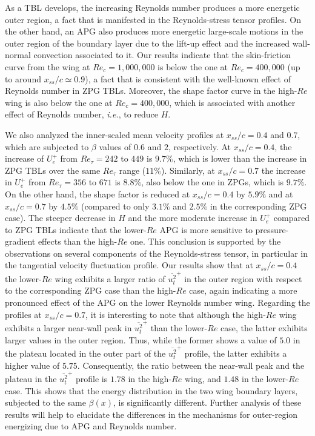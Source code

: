\documentclass[preprint,12pt,authoryear]{elsarticle}
\begin{document}
As a TBL develops, the increasing Reynolds number produces a more energetic outer region, a fact that is manifested in the Reynolds-stress tensor profiles. On the other hand, an APG also produces more energetic large-scale motions in the outer region of the boundary layer due to the lift-up effect and the increased wall-normal convection associated to it. Our results indicate that the skin-friction curve from the wing at $Re_{c}=1,000,000$ is below the one at $Re_{c}=400,000$ (up to around $x_{ss}/c \simeq 0.9$), a fact that is consistent with the well-known effect of Reynolds number in ZPG TBLs. Moreover, the shape factor curve in the high-$Re$ wing is also below the one at $Re_{c}=400,000$, which is associated with another effect of Reynolds number, {\it i.e.}, to reduce $H$. 

We also analyzed the inner-scaled mean velocity profiles at $x_{ss}/c=0.4$ and $0.7$, which are subjected to $\beta$ values of $0.6$ and $2$, respectively. At $x_{ss}/c=0.4$, the increase of $U^{+}_{e}$ from $Re_{\tau}=242$ to $449$ is $9.7\%$, which is lower than the increase in ZPG TBLs over the same $Re_{\tau}$ range ($11\%$). Similarly, at $x_{ss}/c=0.7$ the increase in $U^{+}_{e}$ from $Re_{\tau}=356$ to $671$ is $8.8\%$, also below the one in ZPGs, which is $9.7\%$. On the other hand, the shape factor is reduced at $x_{ss}/c=0.4$ by $5.9\%$ and at $x_{ss}/c=0.7$ by $4.5\%$ (compared to only $3.1\%$ and $2.5\%$ in the corresponding ZPG case). The steeper decrease in $H$ and the more moderate increase in $U^{+}_{e}$ compared to ZPG TBLs indicate that the lower-$Re$ APG is more sensitive to pressure-gradient effects than the high-$Re$ one. This conclusion is supported by the observations on several components of the Reynolds-stress tensor, in particular in the tangential velocity fluctuation profile. Our results show that at $x_{ss}/c=0.4$ the lower-$Re$ wing exhibits a larger ratio of $\overline{u^{2}_{t}}^{+}$ in the outer region with respect to the corresponding ZPG case than the high-$Re$ case, again indicating a more pronounced effect of the APG on the lower Reynolds number wing. Regarding the profiles at $x_{ss}/c=0.7$, it is interesting to note that although the high-$Re$ wing exhibits a larger near-wall peak in $\overline{u^{2}_{t}}^{+}$ than the lower-$Re$ case, the latter exhibits larger values in the outer region. Thus, while the former shows a value of $5.0$ in the plateau located in the outer part of the $\overline{u^{2}_{t}}^{+}$ profile, the latter exhibits a higher value of $5.75$. Consequently, the ratio between the near-wall peak and the plateau in the $\overline{u^{2}_{t}}^{+}$ profile is $1.78$ in the high-$Re$ wing, and $1.48$ in the lower-$Re$ case. This shows that the energy distribution in the two wing boundary layers, subjected to the same $\beta(x)$, is significantly different. Further analysis of these results will help to elucidate the differences in the mechanisms for outer-region energizing due to APG and Reynolds number. 
\end{document}

